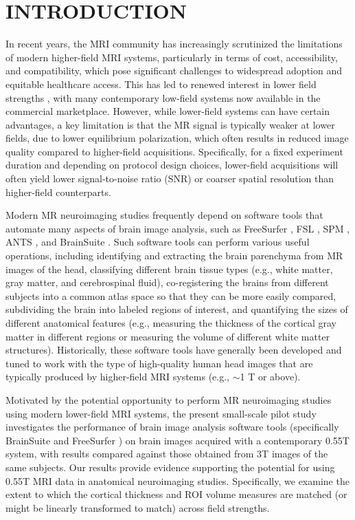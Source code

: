 \documentclass[12pt,letterpaper,onecolumn]{article}
\begin{document}
\section{INTRODUCTION}\label{sec1}
In recent years, the MRI community has increasingly scrutinized the limitations of modern higher-field MRI systems, particularly in terms of cost, accessibility, and compatibility, which pose significant challenges to widespread adoption and equitable healthcare access. This has led to renewed interest in lower field strengths \cite{sarracanie2015,campbellwashburn2019,marques2019,wald2020,marques2021,arnold2023,campbellwashburn2023,campbell2021feasibility}, with many contemporary low-field systems now available in the commercial marketplace.  However, while lower-field systems can have certain advantages, a key limitation is that the MR signal is typically weaker at lower fields, due to lower equilibrium polarization, which often results in reduced image quality compared to higher-field acquisitions.   Specifically, for a fixed experiment duration and depending on protocol design choices, lower-field acquisitions will often yield lower signal-to-noise ratio (SNR) or coarser spatial resolution than higher-field counterparts.

Modern MR neuroimaging studies frequently depend on software tools  that automate many aspects of brain image analysis, such  as FreeSurfer \cite{fischl2012freesurfer}, FSL \cite{jenkinson2012}, SPM \cite{ashburner2009}, ANTS \cite{tustison2021}, and BrainSuite \cite{shattuck2002brainsuite}.  Such software tools can perform various useful operations, including identifying and extracting the brain parenchyma from MR images of the head, classifying different brain tissue types (e.g., white matter, gray matter, and cerebrospinal fluid), co-registering the brains from different subjects into a common atlas space so that they can be more easily compared, subdividing the brain into labeled regions of interest, and quantifying the sizes of different anatomical features (e.g., measuring the thickness of the cortical gray matter in different regions or measuring the volume of different white matter structures).  Historically, these software tools have generally been developed and tuned to work with the type of high-quality human head images that are typically produced by higher-field MRI systems (e.g., $\sim$1 T or above).


Motivated by the potential opportunity to perform MR neuroimaging studies using modern lower-field MRI systems, the present {\color{.}small-scale pilot} study investigates the performance of brain image analysis software tools (specifically BrainSuite \cite{shattuck2002brainsuite} and FreeSurfer \cite{fischl2012freesurfer}) on brain images acquired with a contemporary 0.55T system, with results compared against those obtained from 3T images of the same subjects.  Our results provide evidence supporting the potential for using 0.55T MRI data in anatomical neuroimaging studies. \textcolor{.}{Specifically,  we examine the extent to which the cortical thickness and ROI volume measures are matched (or might be linearly transformed to match) across field strengths.}
\end{document}
